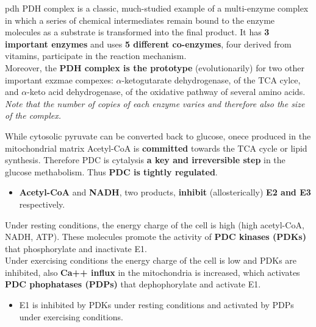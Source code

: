 \documentclass[../main.tex]{subfiles}
\begin{document}
\begin{RemarkWithTitel}{\gls{pdh}}
	PDH complex is a classic, much-studied example of a multi-enzyme complex in which a series of chemical intermediates remain bound to the enzyme molecules as a substrate is transformed into the final product. It has \textbf{3 important enzymes} and uses \textbf{5 different co-enzymes}, four derived from vitamins, participate in the reaction mechanism. \\ 
	Moreover, the \textbf{PDH complex is the prototype} (evolutionarily) for two other important exzmae compexes: $\alpha$-ketogutarate dehydrogenase, of the TCA cylce, and $\alpha$-keto acid dehydrogenase, of the oxidative pathway of several amino acids. \\
	\textit{Note that the number of copies of each enzyme varies and therefore also the size of the complex.} 
\end{RemarkWithTitel}
\noindent 
While cytosolic pyruvate can be converted back to glucose, onece produced in the mitochondrial matrix Acetyl-CoA is \textbf{committed} towards the TCA cycle or lipid synthesis. Therefore PDC is cytalysis \textbf{a key and irreversible step} in the glucose methabolism. Thus \textbf{PDC is tightly regulated}. 
\begin{itemize}
	\item \textbf{Acetyl-CoA} and \textbf{NADH}, two products, \textbf{inhibit} (allosterically) \textbf{E2 and E3} respectively. 
\end{itemize}
\noindent 
Under resting conditions, the energy charge of the cell is high (high acetyl-CoA, NADH, ATP). These molecules promote the activity of \textbf{PDC kinases (PDKs)} that phosphorylate and inactivate E1. \\
Under exercising conditions the energy charge of the cell is low and PDKs are inhibited, also \textbf{Ca++ influx} in the mitochondria is increased, which activates \textbf{PDC phophatases (PDPs)} that dephophorylate and activate E1. 
\begin{itemize}
	\item E1 is inhibited by PDKs under resting conditions and activated by PDPs under exercising conditions.  
\end{itemize}
\end{document}
